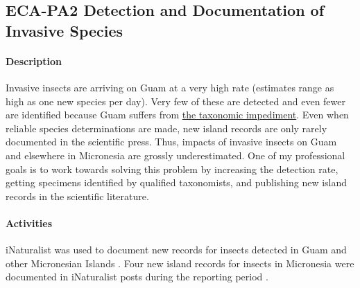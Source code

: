 \subsection{ECA-PA2 Detection and Documentation of Invasive Species}
\begin{refsection}

\paragraph{Description}
Invasive insects are arriving on Guam at a very high rate (estimates
range as high as one new species per day). Very few of these are detected
and even fewer are identified because Guam suffers from \href{https://en.wikipedia.org/wiki/Taxonomic_impediment}{the taxonomic impediment}.
Even when reliable species determinations are made, new island records
are only rarely documented in the scientific press. Thus, impacts
of invasive insects on Guam and elsewhere in Micronesia are grossly
underestimated. One of my professional goals is to work towards solving
this problem by increasing the detection rate, getting specimens identified
by qualified taxonomists, and publishing new island records in the
scientific literature.

\paragraph{Activities}
iNaturalist was used to document new records for insects detected in Guam and other Micronesian Islands \cite{inatSearch20220327}. 
Four new island records for insects in Micronesia were documented in iNaturalist posts during the reporting period \cite{inat108690775, inat103065598, inat57656025, inat48501627}.

\begin{comment}
\paragraph{Plans for 15JUN2021-14JUN2022}

I will continue to document new island records of insects detected in Micronesia.

The International Union for Conservation of Nature (IUCN-ISSG) is
building a Global Register of Introduced and Invasive Species. I have
volunteered to coordinate building a check list for species on Guam.

The Guam Invasive Species Council is required to maintain a list on
invasive species on Guam. I have volunteered to be ``registrar''
for this list.


\end{comment}
\end{refsection}
